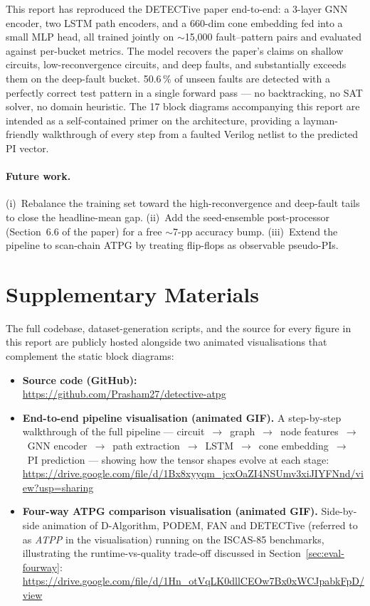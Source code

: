 \documentclass[11pt,a4paper]{article}
\newcommand{\bd}[1]{\textbf{#1}}
\begin{document}
This report has reproduced the DETECTive paper end-to-end: a
3-layer GNN encoder, two LSTM path encoders, and a 660-dim cone
embedding fed into a small MLP head, all trained jointly on
$\sim$15{,}000 fault--pattern pairs and evaluated against per-bucket
metrics. The model recovers the paper's claims on shallow circuits,
low-reconvergence circuits, and deep faults, and substantially
exceeds them on the deep-fault bucket. 50.6\,\% of unseen faults are
detected with a perfectly correct test pattern in a single forward
pass --- no backtracking, no SAT solver, no domain heuristic. The
17 block diagrams accompanying this report are intended as a
self-contained primer on the architecture, providing a layman-friendly
walkthrough of every step from a faulted Verilog netlist to the
predicted PI vector.

\paragraph{Future work.} (i)~Rebalance the training set toward the
high-reconvergence and deep-fault tails to close the headline-mean
gap. (ii)~Add the seed-ensemble post-processor (Section~6.6 of the
paper) for a free $\sim$7-pp accuracy bump. (iii)~Extend the pipeline
to scan-chain ATPG by treating flip-flops as observable
pseudo-PIs.

\section*{Supplementary Materials}

The full codebase, dataset-generation scripts, and the source for
every figure in this report are publicly hosted alongside two
animated visualisations that complement the static block diagrams:

\begin{itemize}[leftmargin=*,itemsep=6pt]
  \item \bd{Source code (GitHub):}\\
        \url{https://github.com/Prasham27/detective-atpg}
  \item \bd{End-to-end pipeline visualisation (animated GIF).} A
        step-by-step walkthrough of the full pipeline ---
        circuit~$\to$~graph~$\to$~node features~$\to$~GNN
        encoder~$\to$~path extraction~$\to$~LSTM~$\to$~cone
        embedding~$\to$~PI prediction --- showing how the tensor
        shapes evolve at each stage:\\
        \url{https://drive.google.com/file/d/1Bx8xyyqm_jcxOaZI4NSUmv3xiJIYFNnd/view?usp=sharing}
  \item \bd{Four-way ATPG comparison visualisation (animated GIF).}
        Side-by-side animation of D-Algorithm, PODEM, FAN and
        DETECTive (referred to as \emph{ATPP} in the visualisation)
        running on the ISCAS-85 benchmarks, illustrating the
        runtime-vs-quality trade-off discussed in
        Section~\ref{sec:eval-fourway}:\\
        \url{https://drive.google.com/file/d/1Hn_otVqLK0dllCEOw7Bx0xWCJpabkFpD/view}
\end{itemize}
\end{document}
